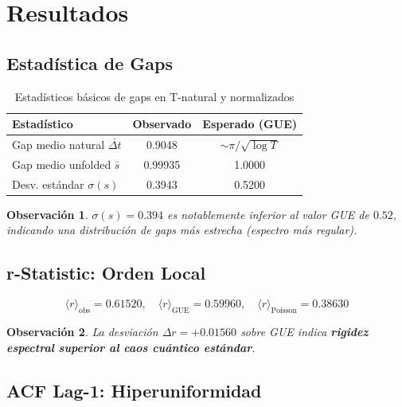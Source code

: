 \documentclass[12pt, a4paper]{article}
\newtheorem{observacion}{Observación}
\begin{document}
\section{Resultados}

\subsection{Estadística de Gaps}

\begin{table}[H]
\centering
\caption{Estadísticos básicos de gaps en T-natural y normalizados}
\begin{tabular}{lcc}
\toprule
\textbf{Estadístico} & \textbf{Observado} & \textbf{Esperado (GUE)} \\
\midrule
Gap medio natural $\bar{\Delta t}$  & 0.9048 & $\sim \pi/\sqrt{\log T}$ \\
Gap medio unfolded $\bar{s}$         & 0.99935 & 1.0000 \\
Desv. estándar $\sigma(s)$           & 0.3943 & 0.5200 \\
\bottomrule
\end{tabular}
\end{table}

\begin{observacion}
$\sigma(s) = 0.394$ es notablemente inferior al valor GUE de $0.52$,
indicando una distribución de gaps más estrecha (espectro más regular).
\end{observacion}

\subsection{r-Statistic: Orden Local}

\[
  \langle r \rangle_{\text{obs}} = 0.61520, \quad
  \langle r \rangle_{\text{GUE}} = 0.59960, \quad
  \langle r \rangle_{\text{Poisson}} = 0.38630
\]

\begin{observacion}
La desviación $\Delta r = +0.01560$ sobre GUE indica \textbf{rigidez
espectral superior al caos cuántico estándar}.
\end{observacion}

\subsection{ACF Lag-1: Hiperuniformidad}
\end{document}
